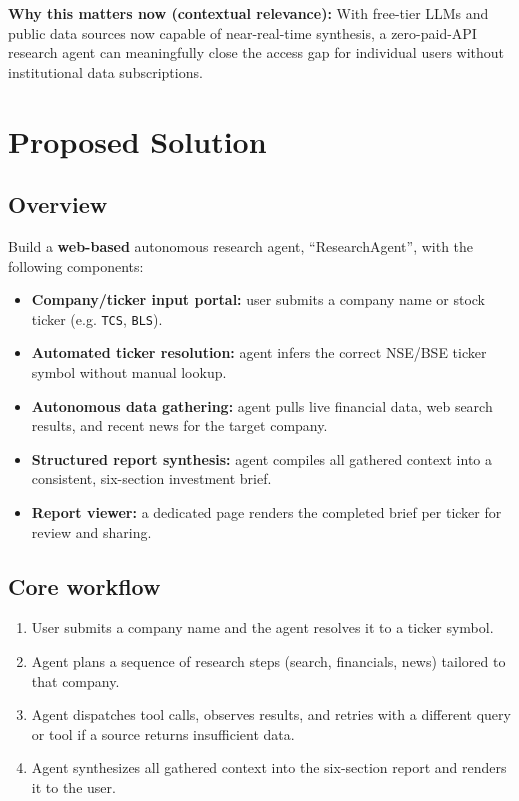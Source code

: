 \documentclass[11pt,a4paper]{article}
\begin{document}
\textbf{Why this matters now (contextual relevance):} With free-tier LLMs and public data sources now capable of near-real-time synthesis, a zero-paid-API research agent can meaningfully close the access gap for individual users without institutional data subscriptions.

\section{Proposed Solution}
\subsection{Overview}
Build a \textbf{web-based} autonomous research agent, ``ResearchAgent'', with the following components:
\begin{itemize}[leftmargin=0.7cm]
    \item \textbf{Company/ticker input portal:} user submits a company name or stock ticker (e.g. \texttt{TCS}, \texttt{BLS}).
    \item \textbf{Automated ticker resolution:} agent infers the correct NSE/BSE ticker symbol without manual lookup.
    \item \textbf{Autonomous data gathering:} agent pulls live financial data, web search results, and recent news for the target company.
    \item \textbf{Structured report synthesis:} agent compiles all gathered context into a consistent, six-section investment brief.
    \item \textbf{Report viewer:} a dedicated page renders the completed brief per ticker for review and sharing.
\end{itemize}

\subsection{Core workflow}
\begin{enumerate}[leftmargin=0.7cm]
    \item User submits a company name and the agent resolves it to a ticker symbol.
    \item Agent plans a sequence of research steps (search, financials, news) tailored to that company.
    \item Agent dispatches tool calls, observes results, and retries with a different query or tool if a source returns insufficient data.
    \item Agent synthesizes all gathered context into the six-section report and renders it to the user.
\end{enumerate}
\end{document}
